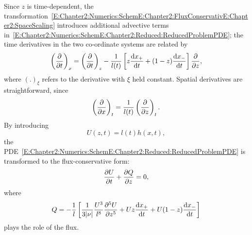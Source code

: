 Since $z$ is time-dependent, the transformation~\eqref{E:Chapter2:Numerics:SchemE:Chapter2:FluxConservativE:Chapter2:SpaceScaling} introduces additional advective terms in~\eqref{E:Chapter2:Numerics:SchemE:Chapter2:Reduced:ReducedProblemPDE}; the time derivatives in the two co-ordinate systems are related by
\begin{equation}\label{E:Chapter2:Numerics:SchemE:Chapter2:FluxConservativE:Chapter2:AdvectiveDerivative}
\left(\frac{\partial }{\partial t}\right)_{x} =\left(\frac{\partial }{\partial t}\right)_{z} -\frac{1}{l(t)}\left[z\frac{\mathrm{d} x_{+}}{\mathrm{d} t} + (1-z)\frac{\mathrm{d} x_{-}}{\mathrm{d} t}       \right]\frac{\partial }{\partial z},
\end{equation}
where $\left(.\right)_{\xi}$ refers to the derivative with  $\xi$ held constant. Spatial derivatives are straightforward, since
\begin{equation}\label{E:Chapter2:Numerics:SchemE:Chapter2:FluxConservativE:Chapter2:SpatialDerivative}
\left(\frac{\partial }{\partial x} \right)_t= \frac{1}{l(t)}\left(\frac{\partial }{\partial z}\right)_t.
\end{equation}
By introducing
\begin{equation}\label{E:Chapter2:Numerics:SchemE:Chapter2:FluxConservativE:Chapter2:Transformation}
U(z,t) = l(t)h(x,t),
\end{equation}
the PDE~\eqref{E:Chapter2:Numerics:SchemE:Chapter2:Reduced:ReducedProblemPDE} is transformed to the flux-conservative form:
\begin{equation}\label{E:Chapter2:Numerics:SchemE:Chapter2:FluxConservativE:Chapter2:FluxConservativeForm}
\frac{\partial U}{\partial t} + \frac{\partial Q}{\partial z} = 0,
\end{equation}
where
\begin{equation}\label{E:Chapter2:Numerics:SchemE:Chapter2:FluxConservativE:Chapter2:FluxExpression}
Q = -\frac{1}{l}\left[\frac{1}{3|\nu|}\frac{U^3}{l^8}\frac{\partial ^5 U}{\partial z^5}  + Uz\frac{\mathrm{d} x_{+}}{\mathrm{d} t} + U(1-z)\frac{\mathrm{d} x_{-}}{\mathrm{d} t}\right]
\end{equation}
plays the role of the flux.

